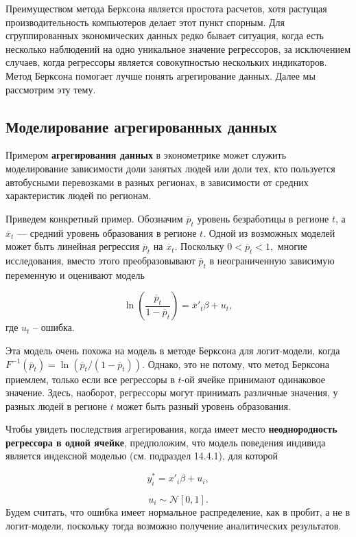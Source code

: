 Преимуществом метода Берксона является простота расчетов,  хотя растущая  производительность компьютеров делает этот пункт спорным. Для сгруппированных экономических данных редко бывает ситуация,  когда есть несколько наблюдений  на одно уникальное значение регрессоров,  за исключением случаев,  когда регрессоры является совокупностью нескольких индикаторов. Метод Берксона помогает лучше понять агрегирование данных. Далее мы рассмотрим эту тему.

\subsection{Моделирование агрегированных данных}

Примером \textbf{агрегирования данных} в эконометрике может служить моделирование зависимости доли занятых людей или доли тех,  кто пользуется автобусными перевозками в разных регионах, в зависимости от  средних характеристик людей по регионам.

Приведем конкретный пример. Обозначим $\overline{p}_t$ уровень безработицы в регионе $t$,  а $\overline{x}_t$ --- средний уровень образования в регионе $t$. Одной из возможных моделей может быть линейная регрессия $\overline{p}_t$ на $\overline{x}_t$. Поскольку $0 < \overline{p}_t < 1, $ многие исследования,  вместо этого преобразовывают  $\overline{p}_t$ в неограниченную зависимую переменную и оценивают модель

\begin{equation} 
\label{GrindEQ__14_27_} 
\ln \left(\frac{\overline{p}_t}{1 - \overline{p}_t}\right) =\overline{x}'_t \beta +u_t,  
\end{equation} 
где $u_t$ -- ошибка.

Эта модель очень похожа на модель в методе Берксона для логит-модели,  когда $F^{-1}(\overline{p}_t) = \ln  (\overline{p}_t/(1-\overline{p}_t))$. Однако,  это не потому,  что метод Берксона приемлем, только если все регрессоры в $t$-ой ячейке принимают одинаковое значение. Здесь,  наоборот,  регрессоры могут принимать различные значения, у разных людей в регионе $t$ может быть разный уровень образования.

Чтобы увидеть последствия агрегирования,  когда имеет место \textbf{неоднородность регрессора в одной ячейке},  предположим,  что модель поведения индивида является индексной моделью (см. подраздел 14.4.1),  для которой 

\[
y^*_i=x'_i\beta +u_i, 
\] 

\[
u_i \sim \mathcal{N}[0, 1].
\] 
Будем считать,  что ошибка имеет нормальное распределение,  как в  пробит,  а не в логит-модели,  поскольку тогда возможно получение аналитических результатов. 


